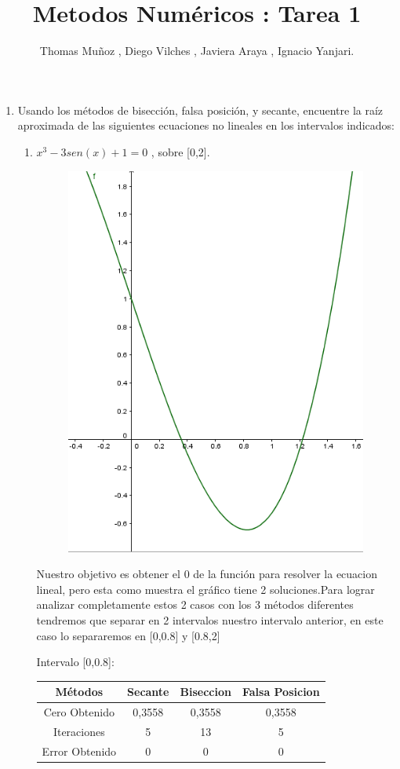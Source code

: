 \documentclass{udparticle}
\title{Metodos Numéricos : Tarea 1}
\author{Thomas Muñoz , Diego Vilches , Javiera Araya , Ignacio Yanjari.}
\begin{document}
\maketitle

\begin{enumerate}

\item Usando los métodos de bisección, falsa posición, y secante, encuentre la raíz aproximada 
de las siguientes ecuaciones no lineales en los intervalos indicados:

\begin{enumerate}
    

\item  \(x^3 - 3sen(x) +1 = 0\) , sobre [0,2].
\begin{figure}[H]
    \centering
    \includegraphics[width=10cm]{GraficoEj1a}
\end{figure}
Nuestro objetivo es obtener el 0 de la función para resolver la ecuacion lineal, pero esta como muestra el gráfico tiene 2 soluciones.Para lograr analizar completamente estos 2 casos con los 3 métodos diferentes tendremos que separar en 2 intervalos nuestro intervalo anterior, en este caso lo separaremos en [0,0.8] y [0.8,2]\\
    \begin{table}[H]Intervalo [0,0.8]:
    \centering
        \begin{tabular} { |c|c|c|c|}
        \hline
        Métodos       & Secante & Biseccion & Falsa Posicion  \\
        \hline
        Cero Obtenido &  0,3558       &    0,3558       &      0,3558    \\
        \hline
        Iteraciones   &     5        &      13     &        5          \\
        \hline
        Error Obtenido &       0      &       0      &     0         \\
         \hline
        \end{tabular}
    \end{table}


\end{enumerate}
\end{enumerate}
\end{document}
